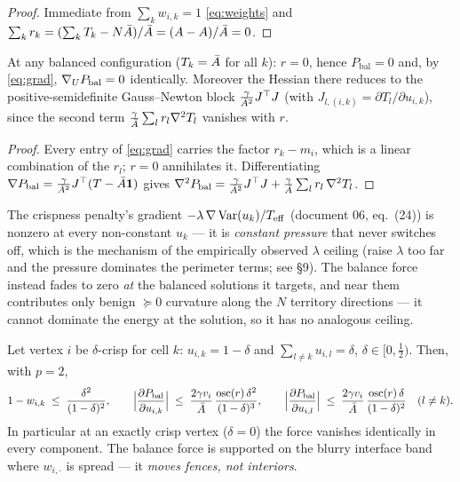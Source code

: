 \documentclass[11pt,a4paper]{article}
\begin{document}
\begin{proof}
Immediate from $\sum_k w_{i,k}=1$ \eqref{eq:weights} and
$\sum_k r_k = (\sum_k T_k - N\bar{A})/\bar{A} = (A-A)/\bar{A} = 0$.
\end{proof}

\begin{prop}
\label{prop:selfdeact}
At any balanced configuration ($T_k=\bar{A}$ for all $k$): $r=0$, hence
$P_{\mathrm{bal}}=0$ and, by \eqref{eq:grad},
$\nabla_U P_{\mathrm{bal}}=0$ identically. Moreover the Hessian there reduces
to the positive-semidefinite Gauss--Newton block
$\frac{\gamma}{\bar{A}^2} J^\top J$ (with $J_{l,(i,k)}=\partial T_l/\partial
u_{i,k}$), since the second term
$\frac{\gamma}{\bar{A}}\sum_l r_l \nabla^2 T_l$ vanishes with $r$.
\end{prop}

\begin{proof}
Every entry of \eqref{eq:grad} carries the factor $r_k-m_i$, which is a
linear combination of the $r_l$; $r=0$ annihilates it. Differentiating
$\nabla P_{\mathrm{bal}} = \frac{\gamma}{\bar{A}^2} J^\top (T-\bar{A}\mathbf 1)$
gives $\nabla^2 P_{\mathrm{bal}} = \frac{\gamma}{\bar{A}^2} J^\top J
+ \frac{\gamma}{\bar{A}}\sum_l r_l\,\nabla^2 T_l$.
\end{proof}

\begin{remark}
The crispness penalty's gradient
$-\lambda\,\nabla\operatorname{Var}(u_k)/T_{\mathrm{eff}}$ (document 06,
eq.~(24)) is nonzero at every non-constant $u_k$ — it is \emph{constant
pressure} that never switches off, which is the mechanism of the empirically
observed $\lambda$ ceiling (raise $\lambda$ too far and the pressure dominates
the perimeter terms; see
 \S9). The
balance force instead fades to zero \emph{at} the balanced solutions it
targets, and near them contributes only benign $\succeq 0$ curvature along
the $N$ territory directions — it cannot dominate the energy at the solution,
so it has no analogous ceiling.
\end{remark}

\begin{prop}
\label{prop:band}
Let vertex $i$ be $\delta$-crisp for cell $k$: $u_{i,k}=1-\delta$ and
$\sum_{l\ne k} u_{i,l}=\delta$, $\delta\in[0,\tfrac12)$. Then, with $p=2$,
\[
  1 - w_{i,k} \;\le\; \frac{\delta^2}{(1-\delta)^2},
  \qquad
  \Bigl|\dfrac{\partial P_{\mathrm{bal}}}{\partial u_{i,k}}\Bigr|
  \;\le\; \frac{2\gamma v_i}{\bar{A}}\,
          \frac{\operatorname{osc}(r)\,\delta^2}{(1-\delta)^3},
  \qquad
  \Bigl|\dfrac{\partial P_{\mathrm{bal}}}{\partial u_{i,l}}\Bigr|
  \;\le\; \frac{2\gamma v_i}{\bar{A}}\,
          \frac{\operatorname{osc}(r)\,\delta}{(1-\delta)^2}
  \quad (l\ne k).
\]
In particular at an exactly crisp vertex ($\delta=0$) the force vanishes
identically in every component. The balance force is supported on the blurry
interface band where $w_{i,\cdot}$ is spread — it \emph{moves fences, not
interiors}.
\end{prop}
\end{document}
